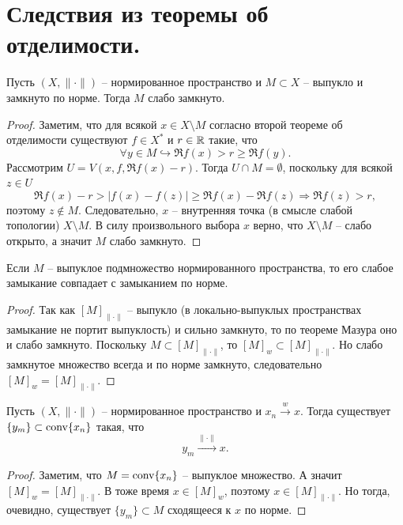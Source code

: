 \section{Следствия из теоремы об отделимости.}
\begin{theorem}[Мазур]\label{th:mazur}
    Пусть $(X, \|\cdot\|)$ -- нормированное пространство и $M \subset X$ -- выпукло и замкнуто по норме.
    Тогда $M$ слабо замкнуто.
\end{theorem}
\begin{proof}
    Заметим, что для всякой $x \in X \setminus M$ согласно второй теореме об отделимости существуют $f \in X^*$ и $r \in \mathbb{R}$ такие, что
    \[
        \forall y \in M \hookrightarrow \Re f(x) > r \geq \Re f(y).
    \]
    Рассмотрим $U = V(x, f, \Re f(x) - r)$.
    Тогда $U \cap M = \emptyset$, поскольку для всякой $z \in U$
    \[
        \Re f(x) - r > |f(x) - f(z)| \geq \Re f(x) - \Re f(z) \Rightarrow \Re f(z) > r,
    \]
    поэтому $z \notin M$.
    Следовательно, $x$ -- внутренняя точка (в смысле слабой топологии) $X \setminus M$.
    В силу произвольного выбора $x$ верно, что $X \setminus M$ -- слабо открыто, а значит $M$ слабо замкнуто.
\end{proof}
\begin{corollary}\label{cor:separability-corollaries}
    Если $M$ -- выпуклое подмножество нормированного пространства, то его слабое замыкание совпадает с замыканием по норме.
\end{corollary}
\begin{proof}
    Так как $[M]_{\|\cdot\|}$ -- выпукло (в локально-выпуклых пространствах замыкание не портит выпуклость) и сильно замкнуто, то по теореме Мазура оно и слабо замкнуто.
    Поскольку $M \subset [M]_{\|\cdot\|}$, то $[M]_{w} \subset [M]_{\|\cdot\|}$.
    Но слабо замкнутое множество всегда и по норме замкнуто, следовательно $[M]_{w} = [M]_{\|\cdot\|}$.
\end{proof}
\begin{corollary}
    Пусть $(X, \|\cdot\|)$ -- нормированное пространство и $x_n \xrightarrow{w} x$.
    Тогда существует $\{y_m\} \subset \operatorname{conv} \{x_n\}$ такая, что
    \[
        y_m \xrightarrow{\|\cdot\|} x.
    \]
\end{corollary}
\begin{proof}
    Заметим, что $M = \operatorname{conv}\{x_n\}$ -- выпуклое множество.
    А значит $[M]_{w} = [M]_{\|\cdot\|}$.
    В тоже время $x \in [M]_{w}$, поэтому $x \in [M]_{\|\cdot\|}$.
    Но тогда, очевидно, существует $\{y_m\} \subset M$ сходящееся к $x$ по норме.
\end{proof}
